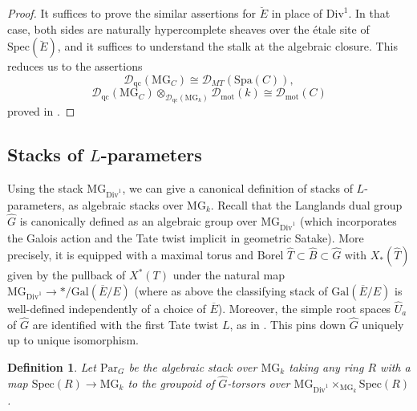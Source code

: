 \documentclass[11pt]{amsart}
\numberwithin{equation}{section}
\numberwithin{theorem}{section}
\newtheorem{definition}[theorem]{Definition}
\theoremstyle{definition}
\newcommand{\Div}{\mathrm{Div}}
\begin{document}
\begin{proof} It suffices to prove the similar assertions for $\breve{E}$ in place of $\mathrm{Div}^1$. In that case, both sides are naturally hypercomplete sheaves over the \'etale site of $\mathrm{Spec}(\breve{E})$, and it suffices to understand the stalk at the algebraic closure. This reduces us to the assertions
\[
\mathcal D_{\mathrm{qc}}(\mathrm{MG}_C)\cong \mathcal D_{MT}(\mathrm{Spa}(C)),
\]
\[
\mathcal D_{\mathrm{qc}}(\mathrm{MG}_C)\otimes_{\mathcal D_{\mathrm{qc}}(\mathrm{MG}_k)} \mathcal D_{\mathrm{mot}}(k)\cong \mathcal D_{\mathrm{mot}}(C)
\]
proved in \cite[Theorem 11.9]{BerkovichMotives}.
\end{proof}

\subsection{Stacks of $L$-parameters} Using the stack $\mathrm{MG}_{\Div^1}$, we can give a canonical definition of stacks of $L$-parameters, as algebraic stacks over $\mathrm{MG}_k$. Recall that the Langlands dual group $\widehat{G}$ is canonically defined as an algebraic group over $\mathrm{MG}_{\mathrm{Div}^1}$ (which incorporates the Galois action and the Tate twist implicit in geometric Satake). More precisely, it is equipped with a maximal torus and Borel $\widehat{T}\subset \widehat{B}\subset \widehat{G}$ with $X_\ast(\widehat{T})$ given by the pullback of $X^\ast(T)$ under the natural map $\mathrm{MG}_{\mathrm{Div}^1}\to \ast/\mathrm{Gal}(\overline{E}/E)$ (where as above the classifying stack of $\mathrm{Gal}(\overline{E}/E)$ is well-defined independently of a choice of $\overline{E}$). Moreover, the simple root spaces $\widehat{U}_a$ of $\widehat{G}$ are identified with the first Tate twist $L$, as in \cite[Section VI.11]{FarguesScholze}. This pins down $\widehat{G}$ uniquely up to unique isomorphism.

\begin{definition} Let $\mathrm{Par}_G$ be the algebraic stack over $\mathrm{MG}_k$ taking any ring $R$ with a map $\mathrm{Spec}(R)\to \mathrm{MG}_k$ to the groupoid of $\widehat{G}$-torsors over $\mathrm{MG}_{\Div^1}\times_{\mathrm{MG}_k} \mathrm{Spec}(R)$.
\end{definition}
\end{document}
